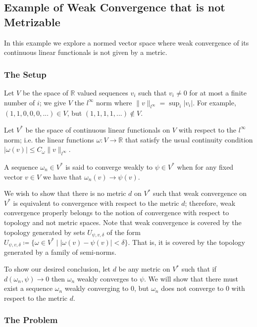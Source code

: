 \subsection{Example of Weak Convergence that is not Metrizable}

In this example we explore a normed vector space where weak convergence of its continuous linear functionals
is not given by a metric. 

\subsubsection*{The Setup}

Let \(V\) be the space of \(\mathbb R\) valued sequences \(v_i\) such that \(v_i \neq 0\) for at most a finite
number of \(i\); we give \(V\) the \(l^\infty\) norm where \(\|v\|_{l^\infty} = \sup_i |v_i|\). For example,
\( (1, 1, 0, 0, 0, ...) \in V\), but \((1, 1, 1, 1, ...)\not\in V\). 

Let \(V^*\) be the space of continuous linear functionals on \(V\) with respect to the \(l^\infty\) norm; i.e.
the linear functions \(\omega : V \to \mathbb R\) that satisfy the usual continuity condition
\(|\omega(v)| \leq C_\omega \|v\|_{l^\infty}\). 

A sequence \(\omega_n \in V^*\) is said to converge weakly to \(\psi \in V^*\) when for any fixed vector
\(v \in V\) we have that \(\omega_n(v) \to \psi(v)\). 

We wish to show that there is no metric \(d\) on \(V^*\) such that weak convergence on \(V^*\) is equivalent to
convergence with respect to the metric \(d\); therefore, weak convergence properly belongs to the notion
of convergence with respect to topology and not metric spaces. Note that weak convergence is covered by the
topology generated by sets \(U_{\psi, v, \delta}\) of the form
\(U_{\psi, v, \delta} \coloneq \{\omega \in V^* \mid |\omega(v) - \psi(v)| < \delta\}\). That is, it is
covered by the topology
generated by a family of semi-norms. 

To show our desired conclusion, let \(d\) be any metric on \(V^*\) such that if 
\(d(\omega_n, \psi) \to 0\) then \(\omega_n\) weakly converges to \(\psi\). We will show that there must
exist a sequence \(\omega_n\) weakly converging to \(0\), but \(\omega_n\) does not converge to \(0\) with
respect to the metric \(d\). 

\subsubsection*{The Problem}

